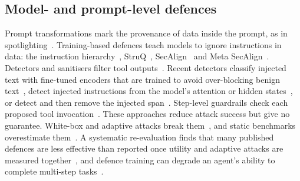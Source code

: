 \documentclass[preprint,12pt,nonatbib]{elsarticle}
\theoremstyle{remark}
\begin{document}
\subsection{Model- and prompt-level defences}
Prompt transformations mark the provenance of data inside the prompt, as in
spotlighting~\citep{hines2024spotlighting}. Training-based defences teach models
to ignore instructions in data: the instruction hierarchy~\citep{wallace2024instruction},
StruQ~\citep{chen2025struq}, SecAlign~\citep{chen2025secalign} and Meta
SecAlign~\citep{chen2025metasecalign}. Detectors and sanitisers filter tool
outputs~\citep{shi2025promptarmor}. Recent detectors classify injected text with
fine-tuned encoders that are trained to avoid over-blocking benign
text~\citep{li2025piguard}, detect injected instructions from the model's
attention or hidden states~\citep{hung2025attentiontracker,wen2025instruction,zhong2026attention},
or detect and then remove the injected span~\citep{chen2025detected,wang2026datafilter}.
Step-level guardrails check each proposed tool invocation~\citep{mou2026toolsafe}.
These approaches reduce attack success but give no guarantee. White-box and adaptive attacks break
them~\citep{zhan2025adaptive,pandya2025attention,chen2026autoinject}, and
static benchmarks overestimate them~\citep{ma2026autodojo}. A systematic
re-evaluation finds that many published defences are less effective than
reported once utility and adaptive attacks are measured
together~\citep{jia2026critical}, and defence training can degrade an agent's
ability to complete multi-step tasks~\citep{li2026autonomytax}.
\end{document}
